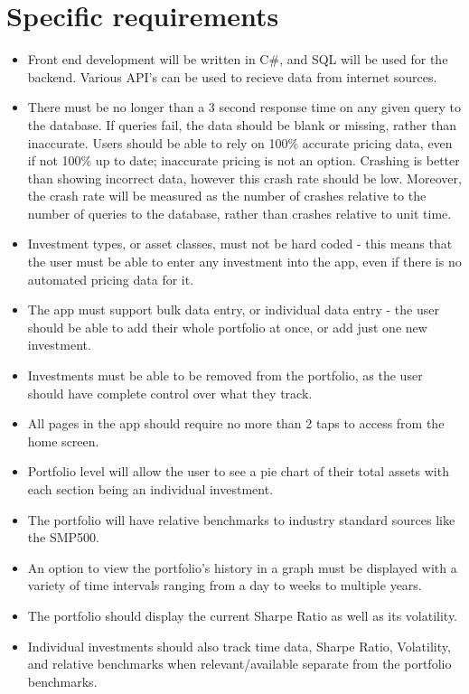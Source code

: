 \documentclass[onecolumn, draftclsnofoot,10pt, compsoc]{IEEEtran}
\begin{document}
\section{Specific requirements}

\begin{itemize}
	\item Front end development will be written in C\#, and SQL will be used for the backend. Various API's can be used to recieve data from internet sources. 
	\item There must be no longer than a 3 second response time on any given query to the database. If queries fail, the data should be blank or missing, 
		rather than inaccurate. Users should be able to rely on 100\% accurate pricing data, even if not 100\% up to date; inaccurate pricing is not an option. Crashing is better than showing incorrect data, however this crash rate should be low. Moreover, the crash rate will be measured as the number of crashes relative to the number of queries to the database, rather than crashes relative to unit time.
	\item Investment types, or asset classes, must not be hard coded - this means that the user must be able to enter any investment into the app, 
		even if there is no automated pricing data for it. 
	\item The app must support bulk data entry, or individual data entry - the user should be able to 
		add their whole portfolio at once, or add just one new investment. 
	\item Investments must be able to be removed from the portfolio, as the user should 
		have complete control over what they track. 
	\item All pages in the app should require no more than 2 taps to access from the home screen.
	\item Portfolio level will allow the user to see a pie chart of their total assets with each section being an individual investment.
	\item The portfolio will have relative benchmarks to industry standard sources like the SMP500.
	\item An option to view the portfolio's history in a graph must be displayed with a variety of time intervals ranging from a day to weeks to multiple years.
	\item The portfolio should display the current Sharpe Ratio as well as its volatility.
	\item Individual investments should also track time data, Sharpe Ratio, Volatility, and relative benchmarks when relevant/available separate from the portfolio benchmarks.

\end{itemize}
\end{document}
